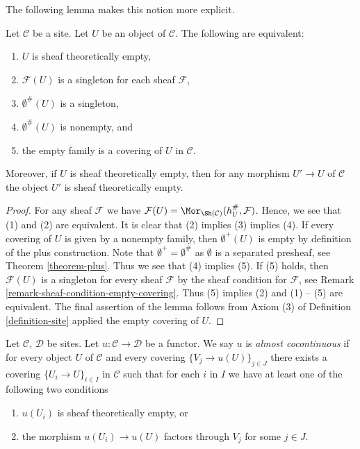 \noindent
The following lemma makes this notion more explicit.

\begin{lemma}
\label{lemma-characterize-empty}
Let $\mathcal{C}$ be a site. Let $U$ be an object of $\mathcal{C}$.
The following are equivalent:
\begin{enumerate}
\item $U$ is sheaf theoretically empty,
\item $\mathcal{F}(U)$ is a singleton for each sheaf $\mathcal{F}$,
\item $\emptyset^\#(U)$ is a singleton,
\item $\emptyset^\#(U)$ is nonempty, and
\item the empty family is a covering of $U$ in $\mathcal{C}$.
\end{enumerate}
Moreover, if $U$ is sheaf theoretically empty, then for any morphism
$U' \to U$ of $\mathcal{C}$ the object $U'$ is sheaf theoretically empty.
\end{lemma}

\begin{proof}
For any sheaf $\mathcal{F}$ we have
$\mathcal{F}(U) = \Mor_{\Sh(\mathcal{C})}(h_U^\#, \mathcal{F})$.
Hence, we see that (1) and (2) are equivalent.
It is clear that (2) implies (3) implies (4).
If every covering of $U$ is given by a nonempty family,
then $\emptyset^+(U)$ is empty by definition of the plus construction.
Note that $\emptyset^+ = \emptyset^\#$ as $\emptyset$ is a separated
presheaf, see
Theorem \ref{theorem-plus}.
Thus we see that (4) implies (5). If (5) holds, then
$\mathcal{F}(U)$ is a singleton for every sheaf $\mathcal{F}$
by the sheaf condition for $\mathcal{F}$, see
Remark \ref{remark-sheaf-condition-empty-covering}.
Thus (5) implies (2) and (1) -- (5) are equivalent. The final
assertion of the lemma follows from Axiom (3) of
Definition \ref{definition-site}
applied the empty covering of $U$.
\end{proof}

\begin{definition}
\label{definition-almost-cocontinuous}
Let $\mathcal{C}$, $\mathcal{D}$ be sites.
Let $u : \mathcal{C} \to \mathcal{D}$ be a functor.
We say $u$ is {\it almost cocontinuous} if for every
object $U$ of $\mathcal{C}$ and every covering
$\{V_j \to u(U)\}_{j \in J}$ there exists a covering
$\{U_i \to U\}_{i \in I}$ in $\mathcal{C}$ such that
for each $i$ in $I$ we have at least one of the following two conditions
\begin{enumerate}
\item $u(U_i)$ is sheaf theoretically empty, or
\item the morphism $u(U_i) \to u(U)$ factors through $V_j$ for some $j \in J$.
\end{enumerate}
\end{definition}

